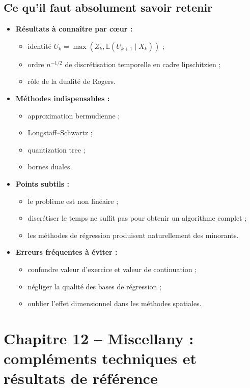 \documentclass[11pt,a4paper]{article}
\newcommand{\E}{\mathbb{E}}
\begin{document}
\subsection{Ce qu'il faut absolument savoir retenir}

\begin{itemize}
  \item \textbf{Résultats à connaître par cœur :}
  \begin{itemize}
    \item identité $U_k=\max(Z_k,\E(U_{k+1}\mid X_k))$ ;
    \item ordre $n^{-1/2}$ de discrétisation temporelle en cadre lipschitzien ;
    \item rôle de la dualité de Rogers.
  \end{itemize}
  \item \textbf{Méthodes indispensables :}
  \begin{itemize}
    \item approximation bermudienne ;
    \item Longstaff--Schwartz ;
    \item quantization tree ;
    \item bornes duales.
  \end{itemize}
  \item \textbf{Points subtils :}
  \begin{itemize}
    \item le problème est non linéaire ;
    \item discrétiser le temps ne suffit pas pour obtenir un algorithme complet ;
    \item les méthodes de régression produisent naturellement des minorants.
  \end{itemize}
  \item \textbf{Erreurs fréquentes à éviter :}
  \begin{itemize}
    \item confondre valeur d'exercice et valeur de continuation ;
    \item négliger la qualité des bases de régression ;
    \item oublier l'effet dimensionnel dans les méthodes spatiales.
  \end{itemize}
\end{itemize}

\section{Chapitre 12 -- Miscellany : compléments techniques et résultats de référence}
\end{document}
